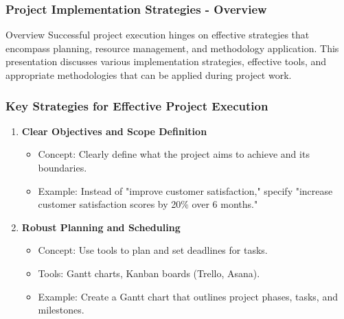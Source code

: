 \documentclass[aspectratio=169]{beamer}
\begin{document}
\begin{frame}[fragile]
  \frametitle{Project Implementation Strategies - Overview}
  \begin{block}{Overview}
    Successful project execution hinges on effective strategies that encompass planning, resource management, and methodology application. This presentation discusses various implementation strategies, effective tools, and appropriate methodologies that can be applied during project work.
  \end{block}
\end{frame}

\begin{frame}[fragile]
  \frametitle{Key Strategies for Effective Project Execution}
  \begin{enumerate}
    \item \textbf{Clear Objectives and Scope Definition}
      \begin{itemize}
        \item Concept: Clearly define what the project aims to achieve and its boundaries.
        \item Example: Instead of "improve customer satisfaction," specify "increase customer satisfaction scores by 20\% over 6 months."
      \end{itemize}

    \item \textbf{Robust Planning and Scheduling}
      \begin{itemize}
        \item Concept: Use tools to plan and set deadlines for tasks.
        \item Tools: Gantt charts, Kanban boards (Trello, Asana).
        \item Example: Create a Gantt chart that outlines project phases, tasks, and milestones.
      \end{itemize}
  \end{enumerate}
\end{frame}
\end{document}
